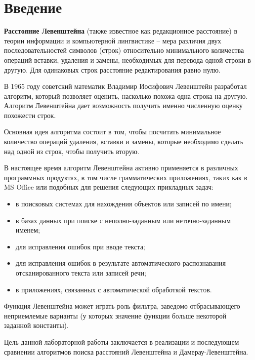 \documentclass[12pt,a4paper]{report}
\begin{document}
	


\tableofcontents{}

\newpage
\chapter*{Введение}

\textbf{Расстояние Левенштейна} (также известное как редакционное расстояние) 
в теории информации и компьютерной лингвистике – мера различия двух последовательностей символов 
(строк) относительно минимального количества операций вставки, удаления и замены, необходимых для
перевода одной строки в другую. Для одинаковых строк расстояние редактирования равно нулю. 

В 1965 году советский математик Владимир Иосифович Левенштейн разработал алгоритм, который позволяет 
оценить, насколько похожа одна строка на другую. Алгоритм Левенштейна дает возможность получить
именно численную оценку похожести строк.

Основная идея алгоритма состоит в том, чтобы посчитать 
минимальное количество операций удаления, вставки и замены, которые необходимо сделать над одной
из строк, чтобы получить вторую. 

В настоящее время алгоритм Левенштейна активно применяется в
различных программных продуктах, в том числе грамматических приложениях, таких как в MS Office
или подобных для решения следующих прикладных задач: 
\begin{itemize}
	\item в поисковых системах для нахождения объектов или записей по имени;
	\item в базах данных при поиске с неполно-заданным или неточно-заданным именем; 
	\item для исправления ошибок при вводе текста;
	\item для исправления ошибок в результате автоматического распознавания отсканированного текста или записей речи;
	\item в приложениях, связанных с автоматической обработкой текстов.
\end{itemize}

Функция Левенштейна может играть роль фильтра,
заведомо отбрасывающего неприемлемые варианты (у которых значение функции больше некоторой заданной константы).

Цель данной лабораторной работы заключается в реализации и последующем сравнении алгоритмов поиска 
расстояний Левенштейна и Дамерау-Левенштейна.\\
\end{document}
